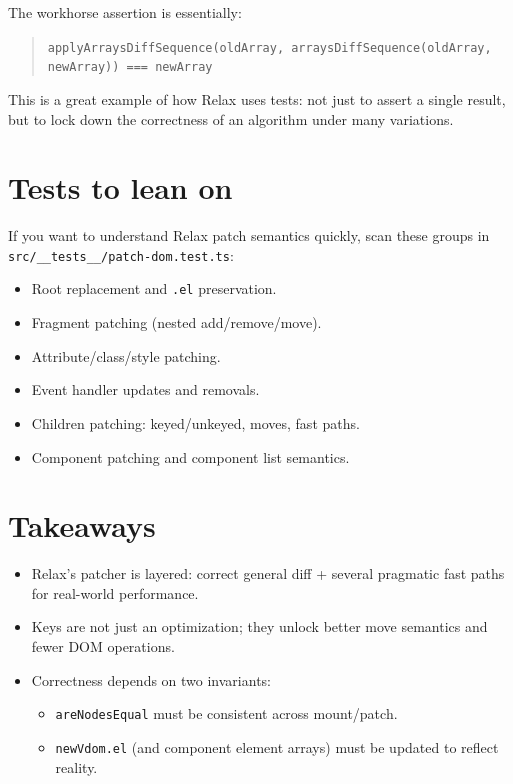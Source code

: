 The workhorse assertion is essentially:

\begin{quote}
    \texttt{applyArraysDiffSequence(oldArray, arraysDiffSequence(oldArray, newArray)) === newArray}
\end{quote}

This is a great example of how Relax uses tests: not just to assert a single result, but to lock down the correctness of an algorithm under many variations.

\section{Tests to lean on}

If you want to understand Relax patch semantics quickly, scan these groups in \texttt{src/\_\_tests\_\_/patch-dom.test.ts}:

\begin{itemize}
  \item Root replacement and \texttt{.el} preservation.
  \item Fragment patching (nested add/remove/move).
  \item Attribute/class/style patching.
  \item Event handler updates and removals.
  \item Children patching: keyed/unkeyed, moves, fast paths.
  \item Component patching and component list semantics.
\end{itemize}

\section{Takeaways}

\begin{itemize}
  \item Relax’s patcher is layered: correct general diff + several pragmatic fast paths for real-world performance.
  \item Keys are not just an optimization; they unlock better move semantics and fewer DOM operations.
  \item Correctness depends on two invariants:
    \begin{itemize}
      \item \texttt{areNodesEqual} must be consistent across mount/patch.
      \item \texttt{newVdom.el} (and component element arrays) must be updated to reflect reality.
    \end{itemize}
\end{itemize}

